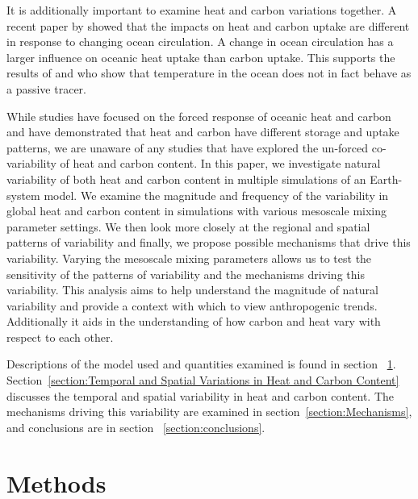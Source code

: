 It is additionally important to examine heat and carbon variations together. A
recent paper by \citet{Winton2013} showed that the impacts on heat and carbon
uptake are different in response to changing ocean circulation. A change in
ocean circulation has a larger influence on oceanic heat uptake than carbon
uptake. This supports the results of \citet{Banks2006} and \citet{Xie2012} who
show that temperature in the ocean does not in fact behave as a passive tracer.

While studies have focused on the forced response of oceanic heat and carbon and
have demonstrated that heat and carbon have different storage and uptake
patterns, we are unaware of any studies that have explored the un-forced
co-variability of heat and carbon content. In this paper, we investigate natural
variability of both heat and carbon content in multiple simulations of an
Earth-system model. We examine the magnitude and frequency of the variability in
global heat and carbon content in simulations with various
mesoscale mixing parameter settings. We then look more closely at the regional
and spatial patterns of variability and finally, we propose possible mechanisms
that drive this variability. Varying the mesoscale mixing parameters allows us
to test the sensitivity of the patterns of variability and the mechanisms
driving this variability. This analysis aims to help understand the magnitude
of natural variability and provide a context with which to view anthropogenic
trends. Additionally it aids in the understanding of how carbon and heat vary
with respect to each other.


Descriptions of the model used and quantities examined is found in section
~\ref{section:methods}. Section~\ref{section:Temporal and Spatial Variations in
Heat and Carbon Content} discusses the temporal and spatial variability in heat
and carbon content. The mechanisms driving this variability are examined in
section~\ref{section:Mechanisms}, and conclusions are in section
~\ref{section:conclusions}.







\section{Methods}
\label{section:methods}
